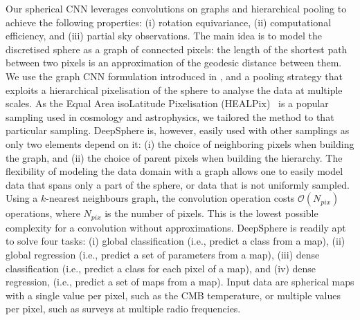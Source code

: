 \documentclass[final,twocolumn,3p,times,sort&compress]{elsarticle}
\newcommand{\1}{\b{1}}              %
\newcommand{\0}{\b{0}}              %
\begin{document}
Our spherical CNN leverages convolutions on graphs and hierarchical pooling to achieve the following properties: (i) rotation equivariance, (ii) computational efficiency, and (iii) partial sky observations.
The main idea is to model the discretised sphere as a graph of connected pixels: the length of the shortest path between two pixels is an approximation of the geodesic distance between them.
We use the graph CNN formulation introduced in \citep{defferrard2016convolutional}, and a pooling strategy that exploits a hierarchical pixelisation of the sphere to analyse the data at multiple scales.
As the Equal Area isoLatitude Pixelisation (HEALPix)~\citep{gorski2005healpix} is a popular sampling used in cosmology and astrophysics, we tailored the method to that particular sampling.
DeepSphere is, however, easily used with other samplings as only two elements depend on it: (i) the choice of neighboring pixels when building the graph, and (ii) the choice of parent pixels when building the hierarchy.
The flexibility of modeling the data domain with a graph allows one to easily model data that spans only a part of the sphere, or data that is not uniformly sampled.
Using a $k$-nearest neighbours graph, the convolution operation costs $\mathcal{O}(N_{pix})$ operations, where $N_{pix}$ is the number of pixels.
This is the lowest possible complexity for a convolution without approximations.
DeepSphere is readily apt to solve four tasks: (i) global classification (i.e., predict a class from a map), (ii) global regression (i.e., predict a set of parameters from a map), (iii) dense classification (i.e., predict a class for each pixel of a map), and (iv) dense regression, (i.e., predict a set of maps from a map).
Input data are spherical maps with a single value per pixel, such as the CMB temperature, or multiple values per pixel, such as surveys at multiple radio frequencies.
\end{document}
